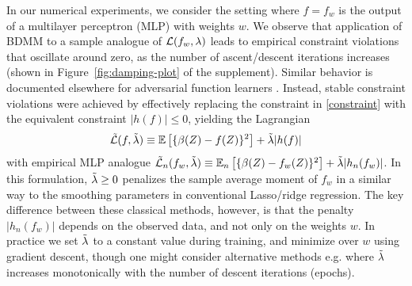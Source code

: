 In our numerical experiments, we consider the setting where $f = f_w$ is the output of a multilayer perceptron (MLP) with weights $w$. We observe that application of BDMM to a sample analogue of $\mathcal{L}(f_w, \lambda)$ leads to empirical constraint violations that oscillate around zero, as the number of ascent/descent iterations increases (shown in Figure~\ref{fig:damping-plot} of the supplement). Similar behavior is documented elsewhere for adversarial function learners \citep{Schafer2019, Mokhtari2020}. Instead, stable constraint violations were achieved by effectively replacing the constraint in \eqref{constraint} with the equivalent constraint $|h(f)| \leq 0$, yielding the Lagrangian
\begin{align}
    \Tilde{\mathcal{L}}(f, \Tilde{\lambda}) \equiv \mathbb{E}\left[\{\beta(Z) - f(Z)\}^2\right] + \Tilde{\lambda} |h(f)| \label{pop_star_lagrangian}
\end{align}
with empirical MLP analogue $\Tilde{\mathcal{L}}_n(f_w, \Tilde{\lambda}) \equiv \mathbb{E}_n\left[\{\beta(Z) - f_w(Z)\}^2\right] + \Tilde{\lambda} |h_n(f_w)|$.
In this formulation, $\Tilde{\lambda} \geq 0$ penalizes the sample average moment of $f_w$ in a similar way to the smoothing parameters in conventional Lasso/ridge regression. The key difference between these classical methods, however, is that the penalty $|h_n(f_w)|$ depends on the observed data, and not only on the weights $w$. In practice we set $\Tilde{\lambda}$ to a constant value during training, and minimize over $w$ using gradient descent, though one might consider alternative methods e.g. where $\Tilde{\lambda}$ increases monotonically with the number of descent iterations (epochs).




